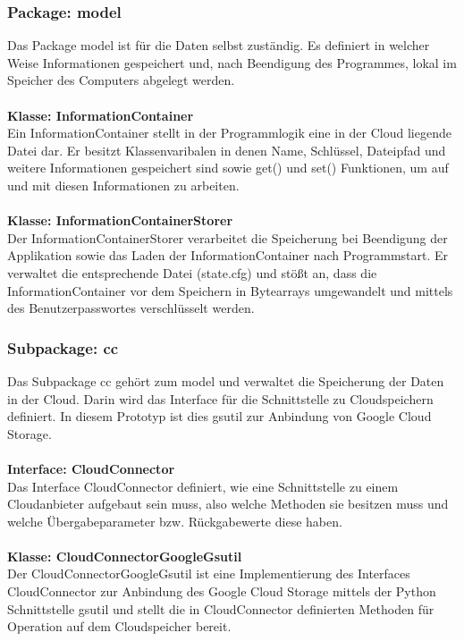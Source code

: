 \documentclass[13pt,a4paper,bibliography=totocnumbered,listof=totocnumbered]{scrartcl}
\begin{document}
\subsubsection{Package: model}
Das Package model ist für die Daten selbst zuständig. Es definiert in welcher Weise Informationen gespeichert und, nach Beendigung des Programmes, lokal im Speicher des Computers abgelegt werden.\\\\
\textbf{Klasse: InformationContainer}\\
Ein InformationContainer stellt in der Programmlogik eine in der Cloud liegende Datei dar. Er besitzt Klassenvaribalen in denen Name, Schlüssel, Dateipfad und weitere Informationen gespeichert sind sowie get() und set() Funktionen, um auf und mit diesen Informationen zu arbeiten.\\\\
\textbf{Klasse: InformationContainerStorer}\\
Der InformationContainerStorer verarbeitet die Speicherung bei Beendigung der Applikation sowie das Laden der InformationContainer nach Programmstart. Er verwaltet die entsprechende Datei (state.cfg) und stößt an, dass die  InformationContainer vor dem Speichern in Bytearrays umgewandelt und mittels des Benutzerpasswortes verschlüsselt werden.
\subsubsection{Subpackage: cc}
Das Subpackage cc gehört zum model und verwaltet die Speicherung der Daten in der Cloud. Darin wird das Interface für die Schnittstelle zu Cloudspeichern definiert. In diesem Prototyp ist dies gsutil zur Anbindung von Google Cloud Storage.\\\\
\textbf{Interface: CloudConnector}\\
Das Interface CloudConnector definiert, wie eine Schnittstelle zu einem Cloudanbieter aufgebaut sein muss, also welche Methoden sie besitzen muss und welche Übergabeparameter bzw. Rückgabewerte diese haben.\\\\
\textbf{Klasse: CloudConnectorGoogleGsutil}\\
Der CloudConnectorGoogleGsutil ist eine Implementierung des Interfaces CloudConnector zur Anbindung des Google Cloud Storage mittels der Python Schnittstelle gsutil und stellt die in CloudConnector definierten Methoden für Operation auf dem Cloudspeicher bereit.
\end{document}
